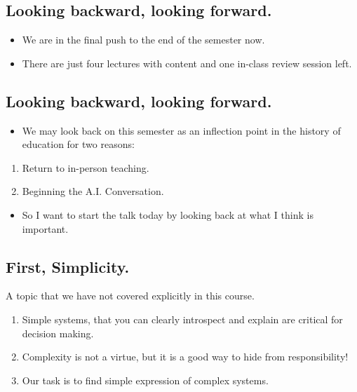 \hypertarget{looking-backward-looking-forward.}{%
\subsection{Looking backward, looking
forward.}\label{looking-backward-looking-forward.}}

\begin{itemize}
\tightlist
\item
  We are in the final push to the end of the semester now.
\item
  There are just four lectures with content and one in-class review
  session left.
\end{itemize}

\hypertarget{looking-backward-looking-forward.-1}{%
\subsection{Looking backward, looking
forward.}\label{looking-backward-looking-forward.-1}}

\begin{itemize}
\tightlist
\item
  We may look back on this semester as an inflection point in the
  history of education for two reasons:
\end{itemize}

\begin{enumerate}
\def\labelenumi{\arabic{enumi}.}
\tightlist
\item
  Return to in-person teaching.
\item
  Beginning the A.I. Conversation.
\end{enumerate}

\begin{itemize}
\tightlist
\item
  So I want to start the talk today by looking back at what I think is
  important.
\end{itemize}

\hypertarget{first-simplicity.}{%
\subsection{First, Simplicity.}\label{first-simplicity.}}

A topic that we have not covered explicitly in this course.

\begin{enumerate}
\def\labelenumi{\arabic{enumi}.}
\tightlist
\item
  Simple systems, that you can clearly introspect and explain are
  critical for decision making.
\item
  Complexity is not a virtue, but it is a good way to hide from
  responsibility!
\item
  Our task is to find simple expression of complex systems.
\end{enumerate}

